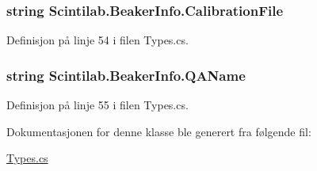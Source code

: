 \hypertarget{class_scintilab_1_1_beaker_info_a978205fb02070c6986658d7dd4d906fa}{
\subsubsection[{Calibration\+File}]{\setlength{\rightskip}{0pt plus 5cm}string Scintilab.\+Beaker\+Info.\+Calibration\+File}}\label{class_scintilab_1_1_beaker_info_a978205fb02070c6986658d7dd4d906fa}


Definisjon på linje 54 i filen Types.\+cs.

\hypertarget{class_scintilab_1_1_beaker_info_a77fc3aac52eb159c41750b306033e06e}{
\subsubsection[{Q\+A\+Name}]{\setlength{\rightskip}{0pt plus 5cm}string Scintilab.\+Beaker\+Info.\+Q\+A\+Name}}\label{class_scintilab_1_1_beaker_info_a77fc3aac52eb159c41750b306033e06e}


Definisjon på linje 55 i filen Types.\+cs.



Dokumentasjonen for denne klasse ble generert fra følgende fil\+:\begin{DoxyCompactItemize}
\item 
\hyperlink{_types_8cs}{Types.\+cs}\end{DoxyCompactItemize}
